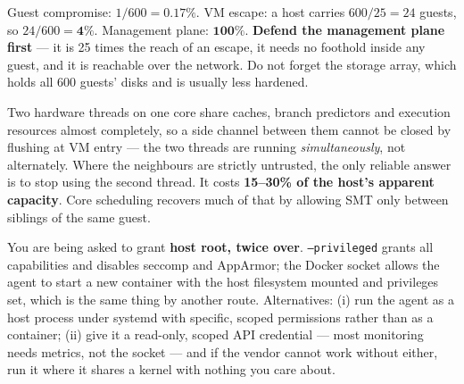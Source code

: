 \begin{ans}
  \item Guest compromise: $1/600 = \mathbf{0.17\%}$. VM escape: a host carries
        $600/25 = 24$ guests, so $24/600 = \mathbf{4\%}$. Management plane:
        $\mathbf{100\%}$. \textbf{Defend the management plane first} --- it is
        25 times the reach of an escape, it needs no foothold inside any guest,
        and it is reachable over the network. Do not forget the storage array,
        which holds all 600 guests' disks and is usually less hardened.
  \item Two hardware threads on one core share caches, branch predictors and
        execution resources almost completely, so a side channel between them
        cannot be closed by flushing at VM entry --- the two threads are running
        \emph{simultaneously}, not alternately. Where the neighbours are
        strictly untrusted, the only reliable answer is to stop using the second
        thread. It costs \textbf{15--30\% of the host's apparent capacity}.
        Core scheduling recovers much of that by allowing SMT only between
        siblings of the same guest.
  \item You are being asked to grant \textbf{host root, twice over}.
        \texttt{--privileged} grants all capabilities and disables seccomp and
        AppArmor; the Docker socket allows the agent to start a new container
        with the host filesystem mounted and privileges set, which is the same
        thing by another route. Alternatives: (i) run the agent as a host
        process under systemd with specific, scoped permissions rather than as a
        container; (ii) give it a read-only, scoped API credential --- most
        monitoring needs metrics, not the socket --- and if the vendor cannot
        work without either, run it where it shares a kernel with nothing you
        care about.
\end{ans}

